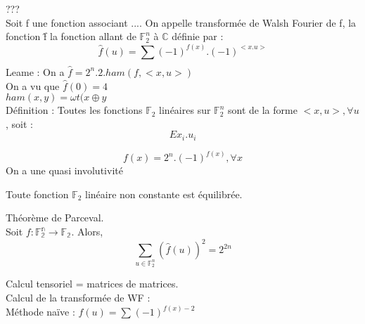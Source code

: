 ???\\
Soit f une fonction associant .... On appelle transformée de Walsh Fourier de f, la fonction \^{f} la fonction allant de $\mathbb{F}_2^n$ à $\mathbb{C}$ définie par :
\begin{equation}
 \hat{f}(u) = \sum_{}^{} (-1)^{f(x)}.(-1)^{<x.u>}
\end{equation}
Leame : On a $\hat{f}=2^n.2.ham(f, <x,u>)$\\
On a vu que $\hat{f}(0)=4$\\
$ham(x,y)=\omega t(x\oplus y$\\
Définition : Toutes les fonctions $\mathbb{F}_2$ linéaires sur $\mathbb{F}_2^n$ sont de la forme $<x,u>, \forall u$, soit :
\begin{equation}
 E x_i.u_i
\end{equation}
\begin{theo}
 \begin{equation}
  f(x)=2^n.(-1)^{f(x)}, \forall x
 \end{equation}
On a une quasi involutivité
\end{theo}
\begin{exo}
 Toute fonction $\mathbb{F}_2$ linéaire non constante est équilibrée.
\end{exo}
\begin{theo}
 Théorème de Parceval.\\
 Soit $f: \mathbb{F_2^n}\rightarrow\mathbb{F_2}$. Alors, 
 \begin{equation}
  \sum_{u\in\mathbb{F}_2^n} (\hat{f}(u))^2 = 2^{2n}
 \end{equation}
\end{theo}
Calcul tensoriel = matrices de matrices.\\
Calcul de la transformée de WF :\\
Méthode naïve : $f(u)=\sum_{} (-1)^{f(x)-2}$\\
